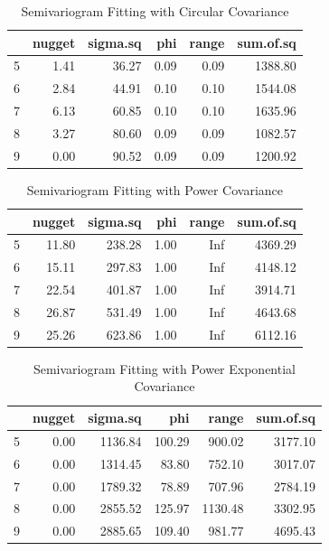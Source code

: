 \documentclass[hidelinks,12pt]{article}
\begin{document}
	\begin{table}[!ht]
		\centering
		\caption{Semivariogram Fitting with Circular Covariance \label{semcir}}
		\begin{tabular}{rrrrrr}
			\hline
			& nugget & sigma.sq & phi & range & sum.of.sq \\ 
			\hline
			5 & 1.41 & 36.27 & 0.09 & 0.09 & 1388.80 \\ 
			6 & 2.84 & 44.91 & 0.10 & 0.10 & 1544.08 \\ 
			7 & 6.13 & 60.85 & 0.10 & 0.10 & 1635.96 \\ 
			8 & 3.27 & 80.60 & 0.09 & 0.09 & 1082.57 \\ 
			9 & 0.00 & 90.52 & 0.09 & 0.09 & 1200.92 \\ 
			\hline
		\end{tabular}
	\end{table}
	\begin{table}[!ht]
		\centering
		\caption{Semivariogram Fitting with Power Covariance \label{sempow}}
		\begin{tabular}{rrrrrr}
			\hline
			& nugget & sigma.sq & phi & range & sum.of.sq \\ 
			\hline
			5 & 11.80 & 238.28 & 1.00 & Inf & 4369.29 \\ 
			6 & 15.11 & 297.83 & 1.00 & Inf & 4148.12 \\ 
			7 & 22.54 & 401.87 & 1.00 & Inf & 3914.71 \\ 
			8 & 26.87 & 531.49 & 1.00 & Inf & 4643.68 \\ 
			9 & 25.26 & 623.86 & 1.00 & Inf & 6112.16 \\ 
			\hline
		\end{tabular}
	\end{table}
	\begin{table}[!ht]
		\centering
		\caption{Semivariogram Fitting with Power Exponential Covariance \label{sempex}}
		\begin{tabular}{rrrrrr}
			\hline
			& nugget & sigma.sq & phi & range & sum.of.sq \\ 
			\hline
			5 & 0.00 & 1136.84 & 100.29 & 900.02 & 3177.10 \\ 
			6 & 0.00 & 1314.45 & 83.80 & 752.10 & 3017.07 \\ 
			7 & 0.00 & 1789.32 & 78.89 & 707.96 & 2784.19 \\ 
			8 & 0.00 & 2855.52 & 125.97 & 1130.48 & 3302.95 \\ 
			9 & 0.00 & 2885.65 & 109.40 & 981.77 & 4695.43 \\ 
			\hline
		\end{tabular}
	\end{table}
\end{document}
